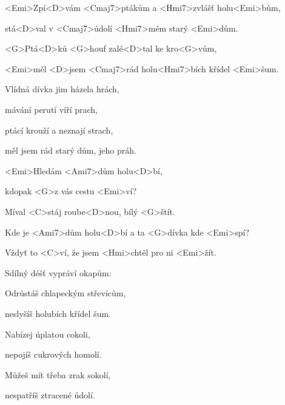 

\zs
<Emi>Zpí<D>vám <Cmaj7>ptákům a <Hmi7>zvlášť holu<Emi>bům,

stá<D>val v <Cmaj7>údolí <Hmi7>mém starý <Emi>dům.

<G>Ptá<D>ků <G>houf zalé<D>tal ke kro<G>vům,

<Emi>měl <D>jsem <Cmaj7>rád holu<Hmi7>bích křídel <Emi>šum.
\ks

\zs
Vlídná dívka jim házela hrách,

mávání perutí víří prach,

ptácí krouží a neznají strach,

měl jsem rád starý dům, jeho práh.
\ks

\zr
<Emi>Hledám <Ami7>dům holu<D>bí,

kdopak <G>z vás cestu <Emi>ví?

Míval <C>stáj roube<D>nou, bílý <G>štít.

Kde je <Ami7>dům holu<D>bí a ta <G>dívka kde <Emi>spí?

Vždyť to <C>ví, že jsem <Hmi>chtěl pro ni <Emi>žít.
\kr

\zs
Sdílný déšť vypráví okapům:


Odrůstáš chlapeckým střevícům,

neslyšíš holubích křídel šum.
\ks

\zs
Nabízej úplatou cokoli,

nepojíš cukrových homolí.

Můžeš mít třeba zrak sokolí,

nespatříš ztracené údolí.
\ks

\zr \kr

\kp
